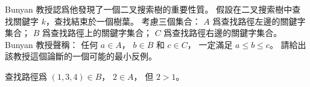 \startEXERCISE
Bunyan 教授認爲他發現了一個二叉搜索樹的重要性質。
假設在二叉搜索樹中查找關鍵字 $k$，查找結束於一個樹葉。
考慮三個集合：
 $A$ 爲查找路徑左邊的關鍵字集合；
 $B$ 爲查找路徑上的關鍵字集合；
 $C$ 爲查找路徑右邊的關鍵字集合。
 Bunyan 教授聲稱：
任何 $a\in A$， $b\in B$ 和 $c\in C$，
一定滿足 $a\le b\le c$。
請給出該教授這個論斷的一個可能的最小反例。
\stopEXERCISE

\startANSWER
\externalfigure[output/e12_2_4-1]
查找路徑爲 $(1,3,4)\in B$， $2\in A$，
但 $2>1$。
\stopANSWER

